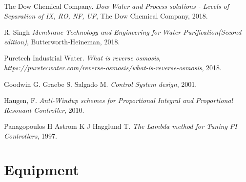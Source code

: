 \documentclass{LTHthesis}
\begin{document}
\medskip
\begin{thebibliography}{9}

The Dow Chemical Company.
\textit{Dow Water and Process solutions - Levels of Separation of IX, RO, NF, UF}, 
The Dow Chemical Company, 2018.

R, Singh
\textit{Membrane Technology and Engineering for Water Purification(Second edition)},
 Butterworth-Heineman, 2018.
 
 Puretech Industrial Water.
 \textit{What is reverse osmosis}, 
 \textit{https://puretecwater.com/reverse-osmosis/what-is-reverse-osmosis}, 
 2018.

 Goodwin G. Graebe S. Salgado M.
 \textit{Control System design},
 2001.

 Haugen, F.
 \textit{Anti-Windup schemes for Proportional Integral and Proportional Resonant Controller}, 
 2010.
 
 Panagopoulos H Astrom K J Hagglund T.
 \textit{The Lambda method for Tuning PI Controllers},
 1997.
 


\end{thebibliography}


\clearpage
\appendix
\chapter{Equipment} 
\label{A}

\end{document}
